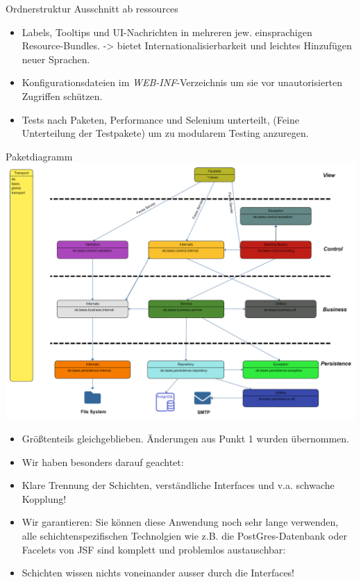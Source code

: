 \documentclass{beamer}
\begin{document}
\begin{frame}{Ordnerstruktur}
        Ausschnitt ab ressources
        \begin{itemize}
            \item Labels, Tooltips und UI-Nachrichten in mehreren jew. einsprachigen Resource-Bundles.
            -> bietet Internationalisierbarkeit und leichtes Hinzufügen neuer Sprachen.
            \pause
            \item Konfigurationsdateien im \emph{WEB-INF}-Verzeichnis um sie vor unautorisierten
            Zugriffen schützen.
            \pause
            \item Tests nach Paketen, Performance und Selenium unterteilt, (Feine Unterteilung der Testpakete)
            um zu modularem Testing anzuregen.
        \end{itemize}
    \end{frame}

    \begin{frame}{Paketdiagramm}
        \centering
        \includegraphics[height=1.1\textheight]{graphics/Paketdiagramm (15)}
        \begin{itemize}
            \item Größtenteils gleichgeblieben. Änderungen aus Punkt 1 wurden übernommen.
            \item Wir haben besonders darauf geachtet:
            \item Klare Trennung der Schichten, verständliche Interfaces und v.a. schwache Kopplung!
            \item Wir garantieren: Sie können diese Anwendung noch sehr lange verwenden,
            alle schichtenspezifischen Technolgien wie z.B. die PostGres-Datenbank
            oder Facelets von JSF sind komplett und problemlos austauschbar:
            \item Schichten wissen nichts voneinander ausser durch die Interfaces!
        \end{itemize}
    \end{frame}
\end{document}
